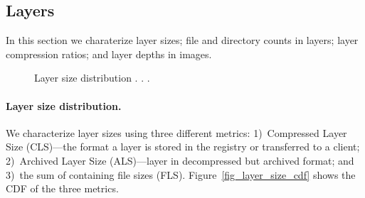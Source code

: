 \subsection{Layers}
\label{sec:layers}

In this section we charaterize layer sizes; file and directory counts in
layers; layer compression ratios; and layer depths in images.

\begin{figure}[!t]
	\centering
	\caption{Layer size distribution
	.
	.
	.
	}
	\label{fig-layer-size}
\end{figure}


\paragraph{Layer size distribution.}
%
We characterize layer sizes using three different metrics:
%
1)~Compressed Layer Size (CLS)---the format a layer is stored in the registry or
transferred to a client;
%
2)~Archived Layer Size (ALS)---layer in decompressed but archived format;
%
and 3)~the sum of containing file sizes (FLS).
%
Figure~\ref{fig_layer_size_cdf} shows the CDF of the three metrics.

